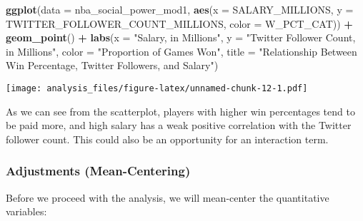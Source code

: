 \documentclass[]{article}
\newenvironment{Shaded}{\begin{snugshade}}{\end{snugshade}}
\newcommand{\DataTypeTok}[1]{\textcolor[rgb]{0.13,0.29,0.53}{#1}}
\newcommand{\KeywordTok}[1]{\textcolor[rgb]{0.13,0.29,0.53}{\textbf{#1}}}
\newcommand{\NormalTok}[1]{#1}
\newcommand{\OperatorTok}[1]{\textcolor[rgb]{0.81,0.36,0.00}{\textbf{#1}}}
\newcommand{\StringTok}[1]{\textcolor[rgb]{0.31,0.60,0.02}{#1}}
\begin{document}
\begin{Shaded}
\begin{Highlighting}[]
\KeywordTok{ggplot}\NormalTok{(}\DataTypeTok{data =}\NormalTok{ nba_social_power_mod1, }
       \KeywordTok{aes}\NormalTok{(}\DataTypeTok{x =}\NormalTok{ SALARY_MILLIONS, }
           \DataTypeTok{y =}\NormalTok{ TWITTER_FOLLOWER_COUNT_MILLIONS,}
           \DataTypeTok{color =}\NormalTok{ W_PCT_CAT)) }\OperatorTok{+}
\StringTok{         }\KeywordTok{geom_point}\NormalTok{() }\OperatorTok{+}\StringTok{ }
\StringTok{  }\KeywordTok{labs}\NormalTok{(}\DataTypeTok{x =} \StringTok{"Salary, in Millions"}\NormalTok{,}
       \DataTypeTok{y =} \StringTok{"Twitter Follower Count, in Millions"}\NormalTok{, }
       \DataTypeTok{color =} \StringTok{"Proportion of Games Won"}\NormalTok{,}
       \DataTypeTok{title =} \StringTok{"Relationship Between Win Percentage,}
\StringTok{       Twitter Followers, and Salary"}\NormalTok{)}
\end{Highlighting}
\end{Shaded}

\texttt{[image: analysis\_files/figure-latex/unnamed-chunk-12-1.pdf]}

As we can see from the scatterplot, players with higher win percentages
tend to be paid more, and high salary has a weak positive correlation
with the Twitter follower count. This could also be an opportunity for
an interaction term.

\hypertarget{adjustments-mean-centering}{%
\subsubsection{Adjustments
(Mean-Centering)}\label{adjustments-mean-centering}}

Before we proceed with the analysis, we will mean-center the
quantitative variables:
\end{document}
